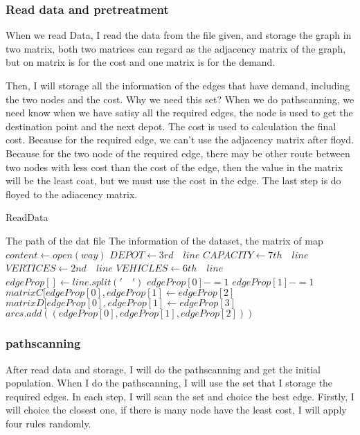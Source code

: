 \documentclass[conference,compsoc]{IEEEtran}
\begin{document}
    \subsubsection{Read data and pretreatment}
      When we read Data, I read the data from the file given, and storage the graph in two matrix, both two matrices can 
      regard as the adjacency matrix of the graph, but on matrix is for the cost and one matrix is for the demand.

      Then, I will storage all the information of the edges that have demand, including the two nodes and the cost. Why we need this set?
      When we do pathscanning, we need know when we have satisy all the required edges, the node is used to get the destination point and the next depot.
      The cost is used to calculation the final cost. Because for the required edge, we can't use the adjacency matrix after floyd. Because for the two node of the required edge, there may be other route between two nodes with less cost than the cost of the edge, then the value in the matrix will be the least coat, but we must use the cost in the edge.
      The last step is do floyed to the adiacency matrix.
      \begin{algorithm}
        \caption{ReadData}
        \begin{algorithmic}[1]
          \Require The path of the dat file
          \Ensure The information of the dataset, the matrix of map
            \State $content \gets open(way)$
            \State $DEPOT\gets 3rd \quad line$
            \State $CAPACITY \gets 7th \quad line$
            \State $VERTICES \gets 2nd \quad line$
            \State $VEHICLES \gets 6th \quad line$
              \State $edgeProp[] \gets line.split('\quad')$
              \State $edgeProp[0] -= 1$
              \State $edgeProp[1] -= 1$
              \State $matrixC[edgeProp[0],edgeProp[1] \gets edgeProp[2]$
              \State $matrixD[edgeProp[0],edgeProp[1] \gets edgeProp[3]$
                \State $arcs.add((edgeProp[0],edgeProp[1],edgeProp[2]))$
              \EndIf  
            \EndWhile
          
          \EndFunction
        \end{algorithmic}
      \end{algorithm}
    \subsubsection{pathscanning}
      After read data and storage, I will do the pathscanning and get the initial population.
      When I do the pathscanning, I will use the set that I storage the required edges. 
      In each step, I will scan the set and choice the best edge. Firstly, I will choice the closest one, if there is many node have the least cost, I will apply four rules randomly.
\end{document}
